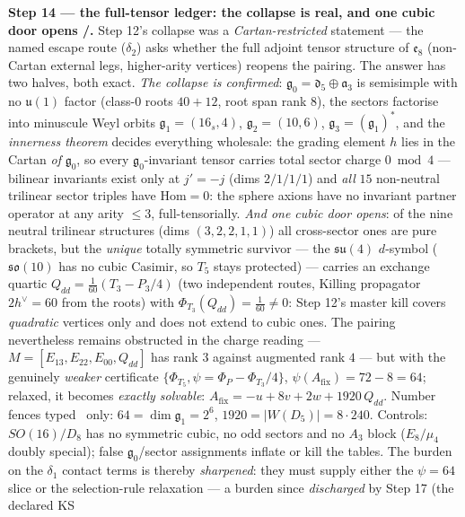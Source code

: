 \documentclass[11pt,a4paper]{article}
\theoremstyle{definition}
\begin{document}
\par\smallskip\noindent\textbf{Step 14 --- the full-tensor ledger: the collapse is real, and one
cubic door opens \mE/\mC.} Step 12's collapse was a \emph{Cartan-restricted} statement --- the
named escape route ($\delta_2$) asks whether the full adjoint tensor structure of $\mathfrak e_8$
(non-Cartan external legs, higher-arity vertices) reopens the pairing. The answer has two halves,
both exact. \emph{The collapse is confirmed}: $\mathfrak g_0=\mathfrak d_5\oplus\mathfrak a_3$ is
semisimple with no $\mathfrak u(1)$ factor (class-$0$ roots $40{+}12$, root span rank $8$), the
sectors factorise into minuscule Weyl orbits $\mathfrak g_1=(16_s,4)$, $\mathfrak g_2=(10,6)$,
$\mathfrak g_3=(\mathfrak g_1)^*$, and the \emph{innerness theorem} decides everything wholesale:
the grading element $h$ lies in the Cartan \emph{of} $\mathfrak g_0$, so every
$\mathfrak g_0$-invariant tensor carries total sector charge $0\bmod4$ --- bilinear invariants
exist only at $j'=-j$ (dims $2/1/1/1$) and \emph{all} $15$ non-neutral trilinear sector triples
have $\mathrm{Hom}=0$: the sphere axions have no invariant partner operator at any arity $\le3$,
full-tensorially. \emph{And one cubic door opens}: of the nine neutral trilinear structures
(dims $(3,2,2,1,1)$) all cross-sector ones are pure brackets, but the \emph{unique} totally
symmetric survivor --- the $\mathfrak{su}(4)$ $d$-symbol ($\mathfrak{so}(10)$ has no cubic
Casimir, so $T_5$ stays protected) --- carries an exchange quartic
$Q_{dd}=\tfrac1{60}(T_3-P_3/4)$ (two independent routes, Killing propagator $2h^\vee=60$ from the
roots) with $\Phi_{T_3}(Q_{dd})=\tfrac1{60}\neq0$: Step 12's master kill covers \emph{quadratic}
vertices only and does not extend to cubic ones. The pairing nevertheless remains obstructed in
the charge reading --- $M=[E_{13},E_{22},E_{00},Q_{dd}]$ has rank $3$ against augmented rank $4$
--- but with the genuinely \emph{weaker} certificate $\{\Phi_{T_5},\psi=\Phi_P-\Phi_{T_3}/4\}$,
$\psi(A_{\mathrm{fix}})=72-8=64$; relaxed, it becomes \emph{exactly solvable}:
$A_{\mathrm{fix}}=-u+8v+2w+1920\,Q_{dd}$. Number fences typed \mC\ only:
$64=\dim\mathfrak g_1=2^6$, $1920=|W(D_5)|=8\cdot240$. Controls: $SO(16)/D_8$ has no symmetric
cubic, no odd sectors and no $A_3$ block ($E_8/\mu_4$ doubly special); false
$\mathfrak g_0$/sector assignments inflate or kill the tables. The burden on the $\delta_1$
contact terms is thereby \emph{sharpened}: they must supply either the $\psi=64$ slice or the
selection-rule relaxation --- a burden since \emph{discharged} by Step 17 (the declared KS
\end{document}
